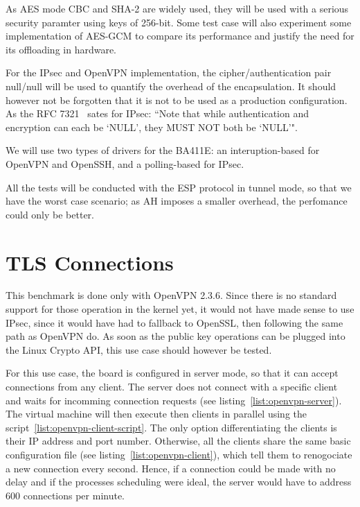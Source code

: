 \noindent As AES mode CBC and SHA-2 are widely used, they will be used with a serious security paramter using keys of 256-bit.
Some test case will also experiment some implementation of AES-GCM to compare its performance and justify the need for its offloading in hardware.

For the IPsec and OpenVPN implementation, the cipher/authentication pair null/null will be used to quantify the overhead of the encapsulation.
It should however not be forgotten that it is not to be used as a production configuration.
As the RFC 7321~\citep[pg. 7]{rfc7321} sates for IPsec: ``Note that while authentication and encryption can each
   be `NULL', they MUST NOT both be `NULL'".

We will use two types of drivers for the BA411E: an interuption-based for OpenVPN and OpenSSH, and a polling-based for IPsec.

All the tests will be conducted with the ESP protocol in tunnel mode, so that we have the worst case scenario; as AH imposes a smaller overhead, the perfomance could only be better.

\section{TLS Connections}
This benchmark is done only with OpenVPN 2.3.6.
Since there is no standard support for those operation in the kernel yet, it would not have made sense to use IPsec, since it would have had to fallback to OpenSSL, then following the same path as OpenVPN do.
As soon as the public key operations can be plugged into the Linux Crypto API, this use case should however be tested.

For this use case, the board is configured in server mode, so that it can accept connections from any client.
The server does not connect with a specific client and waits for incomming connection requests (see listing~\ref{list:openvpn-server}).
The virtual machine will then execute then clients in parallel using the script~\ref{list:openvpn-client-script}.
The only option differentiating the clients is their IP address and port number.
Otherwise, all the clients share the same basic configuration file (see listing~\ref{list:openvpn-client}), which tell them to renogociate a new connection every second.
Hence, if a connection could be made with no delay and if the processes scheduling were ideal, the server would have to address 600 connections per minute.



